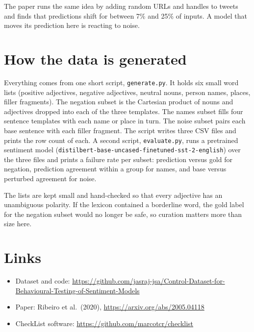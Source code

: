 \documentclass[11pt]{article}
\begin{document}
The paper runs the same idea by adding random URLs and handles to tweets and
finds that predictions shift for between 7\% and 25\% of inputs. A model that
moves its prediction here is reacting to noise.

\section{How the data is generated}

Everything comes from one short script, \texttt{generate.py}. It holds six
small word lists (positive adjectives, negative adjectives, neutral nouns,
person names, places, filler fragments). The negation subset is the Cartesian
product of nouns and adjectives dropped into each of the three templates. The
names subset
fills four sentence templates with each name or place in turn. The noise
subset pairs each base sentence with each filler fragment. The script writes
three CSV files and prints the row count of each. A second script,
\texttt{evaluate.py}, runs a pretrained sentiment model
(\texttt{distilbert-base-uncased-finetuned-sst-2-english}) over the three
files and prints a failure rate per subset: prediction versus gold for
negation, prediction agreement within a group for names, and base versus
perturbed agreement for noise.

The lists are kept small and hand-checked so that every adjective has an
unambiguous polarity. If the lexicon contained a borderline word, the gold
label for the negation subset would no longer be safe, so curation matters
more than size here.

\section{Links}

\begin{itemize}[noitemsep]
  \item Dataset and code:
    \url{https://github.com/jasraj-jsa/Control-Dataset-for-Behavioural-Testing-of-Sentiment-Models}
  \item Paper: Ribeiro et al.\ (2020),
    \url{https://arxiv.org/abs/2005.04118}
  \item CheckList software:
    \url{https://github.com/marcotcr/checklist}
\end{itemize}
\end{document}
